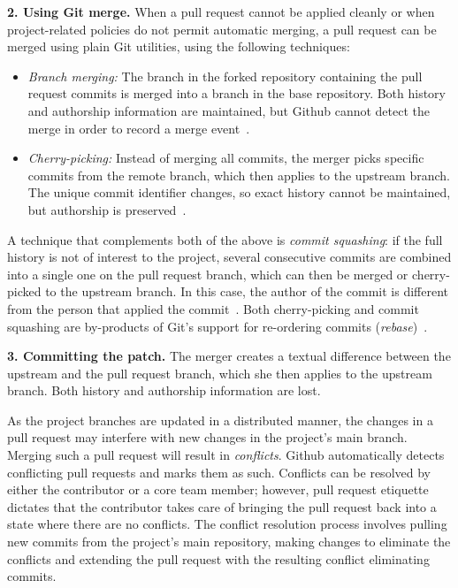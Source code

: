 \documentclass{sig-alternate}
\begin{document}
\textbf{2. Using Git merge.} When a pull request cannot be applied cleanly or
    when project-related policies do not permit automatic merging, a pull
    request can be merged using plain Git utilities, using the following
    techniques: 

    \begin{itemize}

      \item \emph{Branch merging:} The branch in the forked repository
        containing the pull request commits is merged into a branch in the base
        repository. Both history and authorship information are maintained, but
        Github cannot detect the merge in order to record a merge
        event~\cite[Chapter 3.2]{Chaco09}. 

      \item \emph{Cherry-picking:} Instead of merging all commits, the merger
        picks specific commits from the remote branch, which then applies to the
        upstream branch. The unique commit identifier changes, so exact history
        cannot be maintained, but authorship is 
        preserved~\cite[Chapter 5.3]{Chaco09}.
    
    \end{itemize}

    A technique that complements both of the above is \emph{commit
    squa\-shing}: if the full history is not of interest to the project,
    several consecutive commits are combined into a single one on the pull request
    branch, which can then be merged or cherry-picked to the upstream branch. In
    this case, the author of the commit is different from the person that
    applied the commit~\cite[Chapter 6.4]{Chaco09}. Both cherry-picking and
    commit squashing are by-products of Git's support for re-ordering commits
    (\emph{rebase})~\cite[Chapter 3.6]{Chaco09}.

\textbf{3. Committing the patch.} 
  The merger creates a textual difference between the upstream and the pull
  request branch, which she then applies to the upstream branch. Both history and
  authorship information are lost.

As the project branches are updated in a distributed manner, the changes in a
pull request may interfere with new changes in the project's main branch.
Merging such a pull request will result in \emph{conflicts}. Github
automatically detects conflicting pull requests and marks them as such.
Conflicts can be resolved by either the contributor or a core team member;
however, pull request etiquette dictates that the contributor takes care of
bringing the pull request back into a state where there are no conflicts. The
conflict resolution process involves pulling new commits from the project's main
repository, making changes to eliminate the conflicts and
extending the pull request with the resulting conflict eliminating commits.
\end{document}
